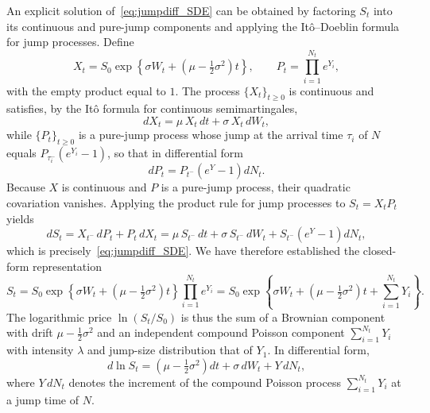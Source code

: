 An explicit solution of~\eqref{eq:jumpdiff_SDE} can be obtained by
factoring $S_t$ into its continuous and pure-jump components and
applying the It\^o--Doeblin formula for jump processes. Define
\[
    X_t = S_0 \exp\!\left\{\sigma W_t
        + \left(\mu - \tfrac{1}{2}\sigma^2\right) t\right\},
    \qquad
    P_t = \prod_{i=1}^{N_t} e^{Y_i},
\]
with the empty product equal to $1$. The process $\{X_t\}_{t\geq 0}$
is continuous and satisfies, by the It\^o formula for continuous
semimartingales,
\[
    dX_t = \mu\, X_t\, dt + \sigma\, X_t\, dW_t,
\]
while $\{P_t\}_{t\geq 0}$ is a pure-jump process whose jump at the
arrival time $\tau_i$ of $N$ equals $P_{\tau_i^-}(e^{Y_i} - 1)$, so
that in differential form
\[
    dP_t = P_{t^-}\!\left(e^{Y} - 1\right) dN_t.
\]
Because $X$ is continuous and $P$ is a pure-jump process, their
quadratic covariation vanishes. Applying the product rule for jump
processes to $S_t = X_t P_t$ yields
\[
    dS_t = X_{t^-}\, dP_t + P_t\, dX_t
         = \mu\, S_{t^-}\, dt + \sigma\, S_{t^-}\, dW_t
         + S_{t^-}\!\left(e^{Y} - 1\right) dN_t,
\]
which is precisely~\eqref{eq:jumpdiff_SDE}. We have therefore
established the closed-form representation
\begin{equation}\label{eq:jumpdiff_sol}
    S_t = S_0 \exp\!\left\{\sigma W_t
        + \left(\mu - \tfrac{1}{2}\sigma^2\right) t\right\}
        \prod_{i=1}^{N_t} e^{Y_i}
        = S_0 \exp\!\left\{\sigma W_t
            + \left(\mu - \tfrac{1}{2}\sigma^2\right) t
            + \sum_{i=1}^{N_t} Y_i\right\}.
\end{equation}
The logarithmic price $\ln(S_t/S_0)$ is thus the sum of a Brownian
component with drift $\mu - \tfrac{1}{2}\sigma^2$ and an independent
compound Poisson component $\sum_{i=1}^{N_t} Y_i$ with intensity
$\lambda$ and jump-size distribution that of $Y_1$. In differential
form,
\begin{equation}
    d\ln S_t = \left(\mu - \tfrac{1}{2}\sigma^2\right) dt
             + \sigma\, dW_t + Y\, dN_t,
\end{equation}
where $Y\,dN_t$ denotes the increment of the compound Poisson process
$\sum_{i=1}^{N_t} Y_i$ at a jump time of $N$.



